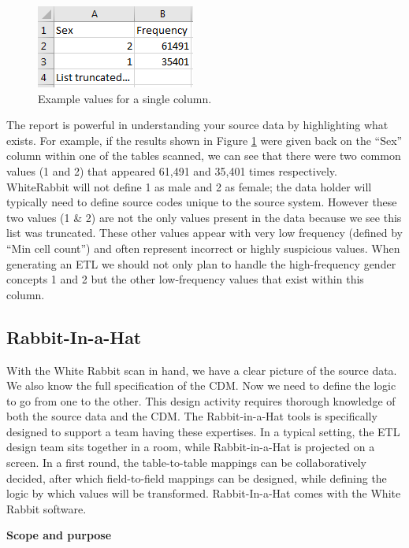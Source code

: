 \documentclass[11pt]{book}
\theoremstyle{definition}
\theoremstyle{definition}
\theoremstyle{definition}
\theoremstyle{remark}
\begin{document}
\begin{figure}
\includegraphics[width=0.3\linewidth]{images/ExtractTransformLoad/ScanSex} \caption{Example values for a single column.}\label{fig:scanSex}
\end{figure}

The report is powerful in understanding your source data by highlighting what exists. For example, if the results shown in Figure \ref{fig:scanSex} were given back on the ``Sex'' column within one of the tables scanned, we can see that there were two common values (1 and 2) that appeared 61,491 and 35,401 times respectively. WhiteRabbit will not define 1 as male and 2 as female; the data holder will typically need to define source codes unique to the source system. However these two values (1 \& 2) are not the only values present in the data because we see this list was truncated. These other values appear with very low frequency (defined by ``Min cell count'') and often represent incorrect or highly suspicious values. When generating an ETL we should not only plan to handle the high-frequency gender concepts 1 and 2 but the other low-frequency values that exist within this column.

\hypertarget{rabbit-in-a-hat}{%
\subsection{Rabbit-In-a-Hat}\label{rabbit-in-a-hat}}

With the White Rabbit scan in hand, we have a clear picture of the source data. We also know the full specification of the CDM. Now we need to define the logic to go from one to the other. This design activity requires thorough knowledge of both the source data and the CDM. The Rabbit-in-a-Hat tools is specifically designed to support a team having these expertises. In a typical setting, the ETL design team sits together in a room, while Rabbit-in-a-Hat is projected on a screen. In a first round, the table-to-table mappings can be collaboratively decided, after which field-to-field mappings can be designed, while defining the logic by which values will be transformed. Rabbit-In-a-Hat comes with the White Rabbit software.

\textbf{Scope and purpose}
\end{document}
